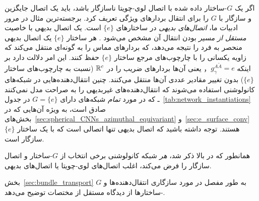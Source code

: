 اگر یک $G$-ساختار داده شده با اتصال لوی-چویتا ناسازگار باشد، باید یک اتصال جایگزین و سازگار با $G$ را برای انتقال بردارهای ویژگی تعریف کرد.
برجسته‌ترین مثال در مرور ادبیات ما، \emph{اتصال‌های بدیهی} در ساختارهای $\{e\}$ است.
یک اتصال بدیهی با خاصیت \emph{مستقل از مسیر} بودن انتقال آن مشخص می‌شود \cite{craneTrivialConnectionsDiscrete2010}.
هر ساختار $\{e\}$ یک اتصال بدیهی منحصر به فرد را نتیجه می‌دهد، که بردارهای مماس را به گونه‌ای منتقل می‌کند که زاویه یکسانی را با چارچوب‌های مرجع ساختار $\{e\}$ حفظ کنند.
این امر دلالت دارد بر اینکه $g_\gamma^{A\widetilde{A}} = e$， یعنی آن‌ها بردارهای ضریب را در $\mathbb{R}^c$ (نسبت به چارچوب‌های ساختار $\{e\}$) بدون تغییر مقادیر عددی آن‌ها منتقل می‌کنند.
چنین انتقال‌دهنده‌هایی در شبکه‌های کانولوشنی استفاده می‌شوند که انتقال‌دهنده‌های غیربدیهی را به صراحت مدل نمی‌کنند ـ که در مورد \emph{تمام} شبکه‌های دارای $G=\{e\}$ در جدول~\ref{tab:network_instantiations} صادق است، به ویژه آن‌هایی که در بخش‌های~\ref{sec:spherical_CNNs_azimuthal_equivariant} و~\ref{sec:e_surface_conv} هستند.
توجه داشته باشید که اتصال بدیهی تنها اتصالی است که با یک ساختار $\{e\}$ سازگار است.

همانطور که در بالا ذکر شد، \emph{هر} شبکه کانولوشنی برخی انتخاب از $G$-ساختار و اتصال سازگار را فرض می‌کند،
اغلب اتصال‌های لوی-چویتا یا اتصال‌های بدیهی.

بخش~\ref{sec:bundle_transport} به طور مفصل در مورد سازگاری انتقال‌دهنده‌ها و $G$-ساختارها از دیدگاه مستقل از مختصات توضیح می‌دهد.